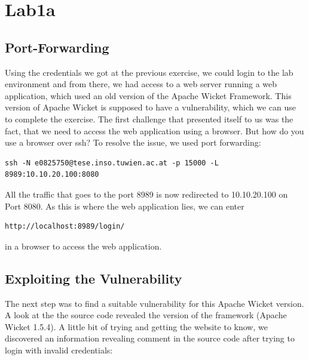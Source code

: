 \documentclass[12pt,a4paper,titlepage,oneside]{scrartcl}
\begin{document}
\maketitle
\setcounter{section}{0}
\setcounter{tocdepth}{2}
\tableofcontents

%
%

\section{Lab1a}

\subsection{Port-Forwarding}

Using the credentials we got at the previous exercise, we could login to the lab environment and from there, we had access to a web server running a web application, which used an old version of the Apache Wicket Framework. This version of Apache Wicket is supposed to have a vulnerability, which we can use to complete the exercise.
The first challenge that presented itself to us was the fact, that we need to access the web application using a browser. But how do you use a browser over ssh? To resolve the issue, we used port forwarding:

\begin{lstlisting}[style=simple]
ssh -N e0825750@tese.inso.tuwien.ac.at -p 15000 -L 8989:10.10.20.100:8080
\end{lstlisting}

All the traffic that goes to the port 8989 is now redirected to 10.10.20.100 on Port 8080. As this is where the web application lies, we can enter

\begin{lstlisting}[style=simple]
http://localhost:8989/login/
\end{lstlisting}

in a browser to access the web application.

\subsection{Exploiting the Vulnerability}
The next step was to find a suitable vulnerability for this Apache Wicket version. A look at the the source code revealed the version of the framework (Apache Wicket 1.5.4). A little bit of trying and getting the website to know, we discovered an information revealing comment in the source code after trying to login with invalid credentials:
\end{document}
